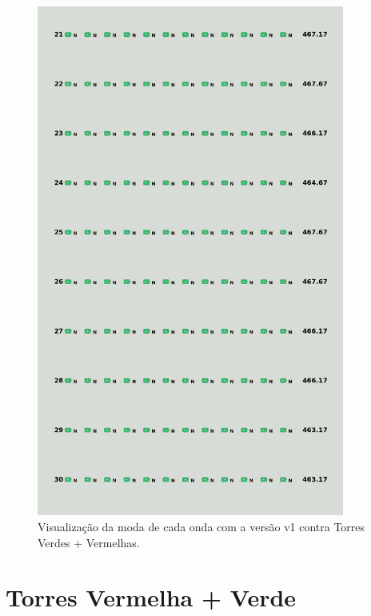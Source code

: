 \begin{figure}[H]
  \centering
  \includegraphics[width=0.9\textwidth]{figuras/td/td_greenred_ai_mode_1_3.png}
  \caption{Visualização da moda de cada onda com a versão v1 contra Torres Verdes + Vermelhas.}
  \label{fig:td-moda-greenred-1-3}
\end{figure}

\section{Torres Vermelha + Verde}
\label{sec:apend-moda-td-rg-v1}

